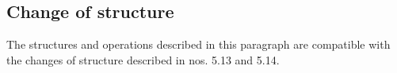 \subsection{Change of structure}

The structures and operations described in this paragraph are compatible with the changes of structure described in nos. 5.13 and 5.14.

\appendix

